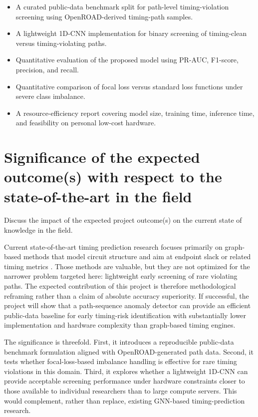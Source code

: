 \documentclass[12pt,a4paper]{article}
\begin{document}
\begin{itemize}
\item A curated public-data benchmark split for path-level timing-violation screening using OpenROAD-derived timing-path samples.
\item A lightweight 1D-CNN implementation for binary screening of timing-clean versus timing-violating paths.
\item Quantitative evaluation of the proposed model using PR-AUC, F1-score, precision, and recall.
\item Quantitative comparison of focal loss versus standard loss functions under severe class imbalance.
\item A resource-efficiency report covering model size, training time, inference time, and feasibility on personal low-cost hardware.
\end{itemize}

\section{Significance of the expected outcome(s) with respect to the state-of-the-art in 
the field}
Discuss the impact of the expected project outcome(s) on the current state of knowledge in the field.

Current state-of-the-art timing prediction research focuses primarily on graph-based methods that model circuit structure and aim at endpoint slack or related timing metrics \cite{Guo2022TimingEngine,Li2025GATSlack}. Those methods are valuable, but they are not optimized for the narrower problem targeted here: lightweight early screening of rare violating paths. The expected contribution of this project is therefore methodological reframing rather than a claim of absolute accuracy superiority. If successful, the project will show that a path-sequence anomaly detector can provide an efficient public-data baseline for early timing-risk identification with substantially lower implementation and hardware complexity than graph-based timing engines.

The significance is threefold. First, it introduces a reproducible public-data benchmark formulation aligned with OpenROAD-generated path data. Second, it tests whether focal-loss-based imbalance handling is effective for rare timing violations in this domain. Third, it explores whether a lightweight 1D-CNN can provide acceptable screening performance under hardware constraints closer to those available to individual researchers than to large compute servers. This would complement, rather than replace, existing GNN-based timing-prediction research.
\end{document}
